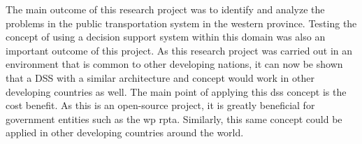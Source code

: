 The main outcome of this research project was to identify and analyze the problems in the public transportation system in the western province. Testing the concept of using a decision support system within this domain was also an important outcome of this project. As this research project was carried out in an environment that is common to other developing nations, it can now be shown that a DSS with a similar architecture and concept would work in other developing countries as well. The main point of applying this \acrshort{dss} concept is the cost benefit. As this is an open-source project, it is greatly beneficial for government entities such as the \acrshort{wp} \acrshort{rpta}. Similarly, this same concept could be applied in other developing countries around the world.





